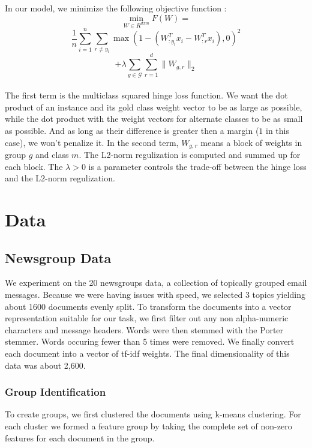 \documentclass[11pt]{article}
\begin{document}
In our model, we minimize the following objective function : \\

$$ \min_{W \in R^{d x m}} F(W) = $$
$$\frac{1}{n} \sum_{i=1}^{n} \sum_{r \neq y_i } \max(1 - ( W_{:y_i}^T  x_i - W_{:r}^T x_i) , 0 )^2 $$
$$ + \lambda \sum_{g \in \mathcal{G}} \sum_{r=1}^{d} \| W_{g,r} \|_2$$ \\

The first term is the multiclass squared hinge loss function. We want the dot 
product of an instance and its gold class weight vector to be as large as 
possible, while the dot product with the weight vectors for alternate classes
to be as small as possible. And as long as their difference is greater then 
a margin ($1$ in this case), we won't penalize it.
 In the second term, $W_{g,r}$ means a block of weights in group $g$ and 
 class $m$. The L2-norm regulization is computed and summed up for each block.
The $\lambda > 0$ is a parameter controls the trade-off between the hinge loss
 and the L2-norm regulization.  

\section{Data}

\subsection{Newsgroup Data}

We experiment on the 20 newsgroups data, a collection of topically grouped 
email messages. 
Because we were having issues with speed, we selected 3 topics yielding
about 1600 documents evenly split.
To transform the documents into a vector representation 
suitable for our task, we first filter out any non alpha-numeric characters
and message headers. Words were then stemmed with the Porter stemmer. 
Words occuring fewer than 5 times were removed.
We finally convert each document into a vector of tf-idf weights.
The final dimensionality of this data was about 2,600.

\subsubsection{Group Identification}

To create groups, we first clustered the documents using k-means clustering.
For each cluster we formed a feature group by taking the complete set of 
non-zero features for each document in the group.\\
\end{document}
